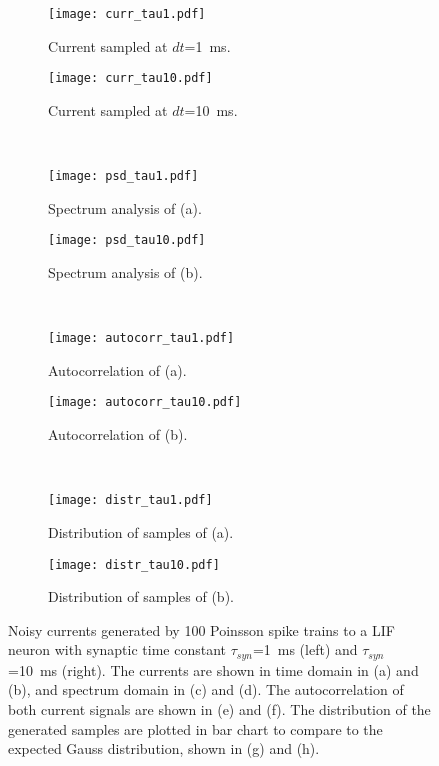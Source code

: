 \documentclass[runningheads,a4paper]{llncs}
\begin{document}
\begin{figure}[tbp!]
	\centering
	  \par
	\begin{subfigure}[t]{0.43\textwidth}
		\texttt{[image: curr\_tau1.pdf]}
		\caption{Current sampled at $dt$=1~ms.}
	\end{subfigure}
	\begin{subfigure}[t]{0.43\textwidth}
		\texttt{[image: curr\_tau10.pdf]}
		\caption{Current sampled at $dt$=10~ms.}
	\end{subfigure}\\
	\begin{subfigure}[t]{0.43\textwidth}
		\texttt{[image: psd\_tau1.pdf]}
		\caption{Spectrum analysis of (a).}
	\end{subfigure}
	\begin{subfigure}[t]{0.43\textwidth}
		\texttt{[image: psd\_tau10.pdf]}
		\caption{Spectrum analysis of (b).}
	\end{subfigure}\\
	\begin{subfigure}[t]{0.43\textwidth}
		\texttt{[image: autocorr\_tau1.pdf]}
		\caption{Autocorrelation of (a).}
	\end{subfigure}
	\begin{subfigure}[t]{0.43\textwidth}
		\texttt{[image: autocorr\_tau10.pdf]}
		\caption{Autocorrelation of (b).}
	\end{subfigure}\\
	\begin{subfigure}[t]{0.43\textwidth}
		\texttt{[image: distr\_tau1.pdf]}
		\caption{Distribution of samples of (a).}
	\end{subfigure}
	\begin{subfigure}[t]{0.43\textwidth}
		\texttt{[image: distr\_tau10.pdf]}
		\caption{Distribution of samples of (b).}
	\end{subfigure}
	\caption{Noisy currents generated by 100 Poinsson spike trains to a LIF neuron with synaptic time constant $\tau_{syn}$=1~ms (left) and $\tau_{syn}$=10~ms (right). The currents are shown in time domain in (a) and (b), and spectrum domain in (c) and (d). The autocorrelation of both current signals are shown in (e) and (f). The distribution of the generated samples are plotted in bar chart to compare to the expected Gauss distribution, shown in (g) and (h).}
	\label{Fig:lif_pois}
\end{figure}
\end{document}

